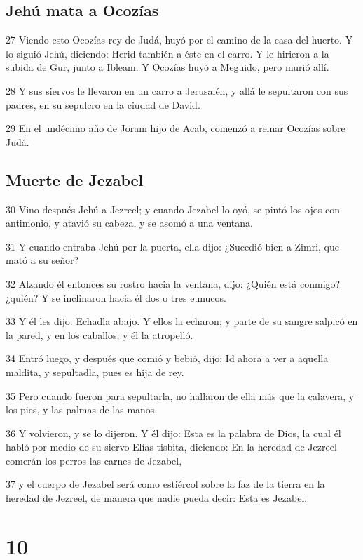 \section*{Jehú mata a Ocozías}

\par 27 Viendo esto Ocozías rey de Judá, huyó por el camino de la casa del huerto. Y lo siguió Jehú, diciendo: Herid también a éste en el carro. Y le hirieron a la subida de Gur, junto a Ibleam. Y Ocozías huyó a Meguido, pero murió allí.
\par 28 Y sus siervos le llevaron en un carro a Jerusalén, y allá le sepultaron con sus padres, en su sepulcro en la ciudad de David.
\par 29 En el undécimo año de Joram hijo de Acab, comenzó a reinar Ocozías sobre Judá.

\section*{Muerte de Jezabel}

\par 30 Vino después Jehú a Jezreel; y cuando Jezabel lo oyó, se pintó los ojos con antimonio, y atavió su cabeza, y se asomó a una ventana.
\par 31 Y cuando entraba Jehú por la puerta, ella dijo: ¿Sucedió bien a Zimri, que mató a su señor?
\par 32 Alzando él entonces su rostro hacia la ventana, dijo: ¿Quién está conmigo? ¿quién? Y se inclinaron hacia él dos o tres eunucos.
\par 33 Y él les dijo: Echadla abajo. Y ellos la echaron; y parte de su sangre salpicó en la pared, y en los caballos; y él la atropelló.
\par 34 Entró luego, y después que comió y bebió, dijo: Id ahora a ver a aquella maldita, y sepultadla, pues es hija de rey.
\par 35 Pero cuando fueron para sepultarla, no hallaron de ella más que la calavera, y los pies, y las palmas de las manos.
\par 36 Y volvieron, y se lo dijeron. Y él dijo: Esta es la palabra de Dios, la cual él habló por medio de su siervo Elías tisbita, diciendo: En la heredad de Jezreel comerán los perros las carnes de Jezabel, 
\par 37 y el cuerpo de Jezabel será como estiércol sobre la faz de la tierra en la heredad de Jezreel, de manera que nadie pueda decir: Esta es Jezabel.

\chapter{10}

